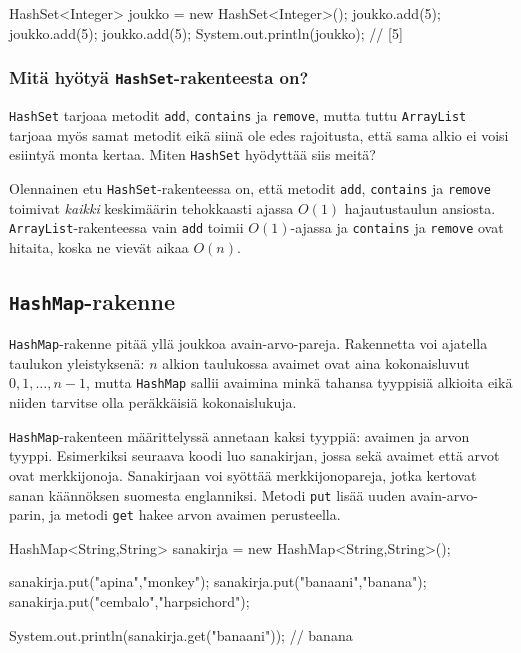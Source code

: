 \begin{code}
HashSet<Integer> joukko = new HashSet<Integer>();
joukko.add(5);
joukko.add(5);
joukko.add(5);
System.out.println(joukko); // [5]
\end{code}

\subsubsection{Mitä hyötyä \texttt{HashSet}-rakenteesta on?}

\texttt{HashSet} tarjoaa metodit \texttt{add},
\texttt{contains} ja \texttt{remove},
mutta tuttu \texttt{ArrayList}
tarjoaa myös samat metodit eikä siinä ole edes rajoitusta,
että sama alkio ei voisi esiintyä monta kertaa.
Miten \texttt{HashSet} hyödyttää siis meitä?

Olennainen etu \texttt{HashSet}-rakenteessa on,
että metodit \texttt{add}, \texttt{contains} ja \texttt{remove}
toimivat \emph{kaikki} keskimäärin tehokkaasti ajassa $O(1)$
hajautustaulun ansiosta.
\texttt{ArrayList}-rakenteessa vain \texttt{add}
toimii $O(1)$-ajassa ja \texttt{contains} ja \texttt{remove}
ovat hitaita, koska ne vievät aikaa $O(n)$.


\subsection{\texttt{HashMap}-rakenne}

\texttt{HashMap}-rakenne pitää yllä joukkoa avain-arvo-pareja.
Rakennetta voi ajatella taulukon yleistyksenä:
$n$ alkion taulukossa avaimet ovat aina kokonaisluvut
$0,1,\ldots,n-1$, mutta \texttt{HashMap} sallii
avaimina minkä tahansa tyyppisiä alkioita eikä niiden
tarvitse olla peräkkäisiä kokonaislukuja.

\texttt{HashMap}-rakenteen määrittelyssä annetaan
kaksi tyyppiä: avaimen ja arvon tyyppi.
Esimerkiksi seuraava koodi luo sanakirjan, jossa sekä
avaimet että arvot ovat merkkijonoja.
Sanakirjaan voi syöttää merkkijonopareja, jotka kertovat
sanan käännöksen suomesta englanniksi.
Metodi \texttt{put} lisää uuden avain-arvo-parin,
ja metodi \texttt{get} hakee arvon avaimen perusteella.

\begin{code}
HashMap<String,String> sanakirja = new HashMap<String,String>();

sanakirja.put("apina","monkey");
sanakirja.put("banaani","banana");
sanakirja.put("cembalo","harpsichord");

System.out.println(sanakirja.get("banaani")); // banana
\end{code}

